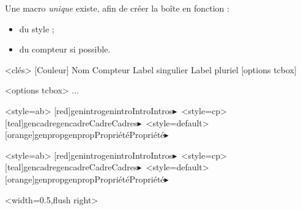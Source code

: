\documentclass[french,11pt,a4paper]{article}
\begin{document}
Une macro \textit{unique} existe, afin de créer la boîte en fonction :

\begin{itemize}
  \item du \textsf{style} ;
  \item du \textsf{compteur} si possible.
\end{itemize}

\begin{codehigh}[language=latex/latex2,style/main=cyan!10,style/code=cyan!10]
\GenereBoite<clés>%
  [Couleur]%
  {Nom}%
  {Compteur}%
  {Label singulier}
  {Label pluriel}
  [options tcbox]


\begin{Nom}[clés]<options tcbox>
...
\end{Nom}
\end{codehigh}

\GenereBoite<style=ab>%
 [red]{genintro}{genintro}{Intro}{Intros}{$\blacktriangleright$\,}
\GenereBoite<style=cp>%
  [teal]{gencadre}{gencadre}{Cadre}{Cadres}{$\blacktriangleright$\,}
\GenereBoite<style=default>%
  [orange]{genprop}{genprop}{Propriété}{Propriété}{$\blacktriangleright$}

\begin{codehigh}[language=latex/latex2,style/main=cyan!10,style/code=cyan!10]
\GenereBoite<style=ab>%
  [red]{genintro}{genintro}{Intro}{Intros}{$\blacktriangleright$\,}
\GenereBoite<style=cp>%
  [teal]{gencadre}{gencadre}{Cadre}{Cadres}{$\blacktriangleright$\,}
\GenereBoite<style=default>%
  [orange]{genprop}{genprop}{Propriété}{Propriété}{$\blacktriangleright$}
\end{codehigh}

\begin{demohigh}[language=latex/latex2,style/main=cyan!10,style/code=cyan!10]
\begin{genintro}\lipsum[1][1]\end{genintro}

\begin{gencadre}\lipsum[2][1]\end{gencadre}

\begin{genprop}<width=0.5\linewidth,flush right>
\lipsum[3][1]
\end{genprop}
\end{demohigh}
\end{document}
